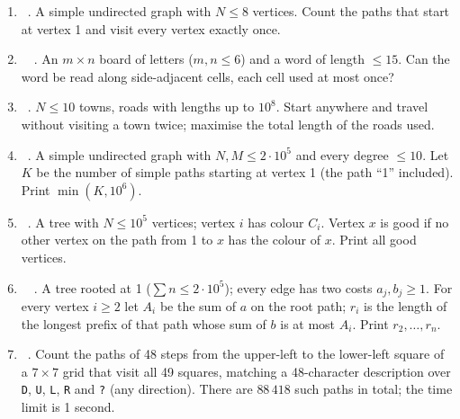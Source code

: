 \exlegend
\begin{enumerate}[leftmargin=*, label=\textbf{E4.\arabic*}, itemsep=6pt]
    \item \exeasy\ \pclassic {}. A simple undirected graph with $N \le 8$ vertices. Count the paths that start at vertex 1 and visit every vertex exactly once.
    \item \exmedium\ \pclassic {}\ . An $m \times n$ board of letters ($m, n \le 6$) and a word of length $\le 15$. Can the word be read along side-adjacent cells, each cell used at most once?
    \item \exeasy\ \pconcept {}. $N \le 10$ towns, roads with lengths up to $10^8$. Start anywhere and travel without visiting a town twice; maximise the total length of the roads used.
    \item \exmedium\ \pconcept {}. A simple undirected graph with $N, M \le 2\cdot10^5$ and every degree $\le 10$. Let $K$ be the number of simple paths starting at vertex 1 (the path ``1'' included). Print $\min(K, 10^6)$.
    \item \exmedium\ \pconcept {}. A tree with $N \le 10^5$ vertices; vertex $i$ has colour $C_i$. Vertex $x$ is good if no other vertex on the path from 1 to $x$ has the colour of $x$. Print all good vertices.
    \item \exhard\ \pconcept {}\ . A tree rooted at 1 ($\sum n \le 2\cdot10^5$); every edge has two costs $a_j, b_j \ge 1$. For every vertex $i \ge 2$ let $A_i$ be the sum of $a$ on the root path; $r_i$ is the length of the longest prefix of that path whose sum of $b$ is at most $A_i$. Print $r_2, \dots, r_n$.
    \item \exhard\ \ptricky {}. Count the paths of 48 steps from the upper-left to the lower-left square of a $7 \times 7$ grid that visit all 49 squares, matching a 48-character description over \texttt{D}, \texttt{U}, \texttt{L}, \texttt{R} and \texttt{?} (any direction). There are $88\,418$ such paths in total; the time limit is 1 second.
\end{enumerate}

